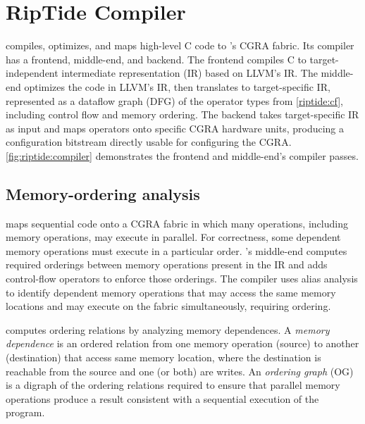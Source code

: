 \newcommand{\pes}{PEs\xspace}
\newcommand{\fend}{frontend\xspace}
\newcommand{\mend}{middle-end\xspace}
\newcommand{\bend}{backend\xspace}

\section{RipTide Compiler}
\label{riptide:compiler}

\figRipTideCompiler
\figRipTideLSO

\riptidecomp compiles, optimizes, and maps high-level C code to \riptide's CGRA fabric. 
%
Its compiler has a \fend, \mend, and \bend.
%
The \fend compiles C to target-independent intermediate representation
(IR) based on LLVM's IR.
%
The \mend optimizes the code in LLVM's IR, then translates to
target-specific IR, represented as a dataflow graph (DFG) of the operator
types from \autoref{riptide:cf}, including control flow and memory ordering.  
%
The \bend takes target-specific IR as input and maps operators onto specific
CGRA hardware units, producing a configuration bitstream directly usable for
configuring the CGRA.
%
\autoref{fig:riptide:compiler} demonstrates the \fend and \mend's compiler passes. 
%

\subsection{Memory-ordering analysis}

\riptidecomp maps sequential code onto a CGRA fabric in which many operations,
including memory operations, may execute in parallel.  
%
For correctness, some dependent memory operations must execute in a particular
order.
%
\riptidecomp's \mend computes required orderings between memory operations present
in the IR and adds control-flow operators to enforce those orderings. 
%
The compiler uses alias analysis to identify dependent memory operations that
may access the same memory locations and may execute on the \riptide fabric
simultaneously, requiring ordering.  

\riptidecomp computes ordering relations by analyzing memory dependences.  
%
A \textit{memory dependence} is an ordered relation from one memory operation
(source) to another (destination) that access same memory location,
where the destination is reachable from the source and one (or both)
are writes.
%
An \textit{ordering graph} (OG) is a digraph of the ordering relations
required to ensure that parallel memory operations produce a
result consistent with a sequential execution of the program.
%


